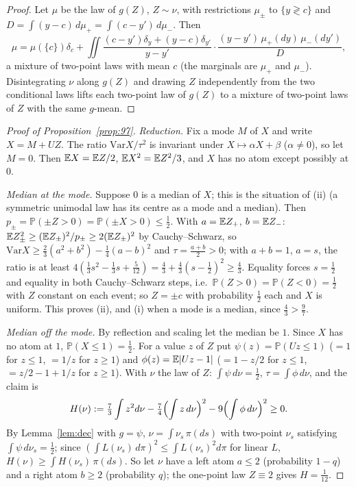 \documentclass[11pt]{amsart}
\theoremstyle{definition}\newtheorem{definition}[theorem]{Definition}\theoremstyle{remark}\newtheorem{remark}[theorem]{Remark}
\begin{document}
\begin{proof}Let $\mu$ be the law of $g(Z)$, $Z\sim\nu$, with restrictions $\mu_\pm$ to $\{y\gtrless c\}$ and $D=\int(y-c)\,d\mu_+=\int(c-y')\,d\mu_-$. Then
\[\mu=\mu(\{c\})\delta_c+\iint\frac{(c-y')\delta_y+(y-c)\delta_{y'}}{y-y'}\cdot\frac{(y-y')\,\mu_+(dy)\,\mu_-(dy')}D,\]
a mixture of two-point laws with mean $c$ (the marginals are $\mu_+$ and $\mu_-$). Disintegrating $\nu$ along $g(Z)$ and drawing $Z$ independently from the two
conditional laws lifts each two-point law of $g(Z)$ to a mixture of two-point laws of $Z$ with the same $g$-mean.\end{proof}
\begin{proof}[Proof of Proposition~\ref{prop:97}]\emph{Reduction.} Fix a mode $M$ of $X$ and write $X=M+UZ$. The ratio $\mathrm{Var}X/\tau^2$ is invariant under
$X\mapsto\alpha X+\beta$ ($\alpha\ne0$), so let $M=0$. Then $\mathbb E X=\mathbb E Z/2$, $\mathbb E X^2=\mathbb E Z^2/3$, and $X$ has no atom except possibly at $0$.

\emph{Median at the mode.} Suppose $0$ is a median of $X$; this is the situation of (ii) (a symmetric unimodal law has its centre as a mode and a median). Then
$p_\pm=\mathbb P(\pm Z>0)=\mathbb P(\pm X>0)\le\frac12$. With $a=\mathbb E Z_+$, $b=\mathbb E Z_-$: $\mathbb E Z_\pm^2\ge(\mathbb E Z_\pm)^2/p_\pm\ge2(\mathbb E Z_\pm)^2$ by Cauchy--Schwarz, so
$\mathrm{Var}X\ge\frac23(a^2+b^2)-\frac14(a-b)^2$ and $\tau=\frac{a+b}2>0$; with $a+b=1$, $a=s$, the ratio is at least $4(\frac13s^2-\frac13s+\frac5{12})=\frac43+\frac43(s-\frac12)^2\ge\frac43$.
Equality forces $s=\frac12$ and equality in both Cauchy--Schwarz steps, i.e.\ $\mathbb P(Z>0)=\mathbb P(Z<0)=\frac12$ with $Z$ constant on each event; so $Z=\pm c$ with
probability $\frac12$ each and $X$ is uniform. This proves (ii), and (i) when a mode is a median, since $\frac43>\frac97$.

\emph{Median off the mode.} By reflection and scaling let the median be $1$. Since $X$ has no atom at $1$, $\mathbb P(X\le1)=\frac12$. For a value $z$ of $Z$ put
$\psi(z)=\mathbb P(Uz\le1)$ ($=1$ for $z\le1$, $=1/z$ for $z\ge1$) and $\phi(z)=\mathbb E|Uz-1|$ ($=1-z/2$ for $z\le1$, $=z/2-1+1/z$ for $z\ge1$). With $\nu$ the law of $Z$: $\int\psi\,d\nu=\frac12$,
$\tau=\int\phi\,d\nu$, and the claim is
\[H(\nu):=\tfrac73\int z^2d\nu-\tfrac74\Bigl(\int z\,d\nu\Bigr)^2-9\Bigl(\int\phi\,d\nu\Bigr)^2\ge0 .\]
By Lemma~\ref{lem:dec} with $g=\psi$, $\nu=\int\nu_s\,\pi(ds)$ with two-point $\nu_s$ satisfying $\int\psi\,d\nu_s=\frac12$; since $(\int L(\nu_s)\,d\pi)^2\le\int L(\nu_s)^2d\pi$ for linear $L$,
$H(\nu)\ge\int H(\nu_s)\,\pi(ds)$. So let $\nu$ have a left atom $a\le2$ (probability $1-q$) and a right atom $b\ge2$ (probability $q$); the one-point law $Z\equiv2$ gives $H=\frac1{12}$.


\end{proof}
\end{document}
